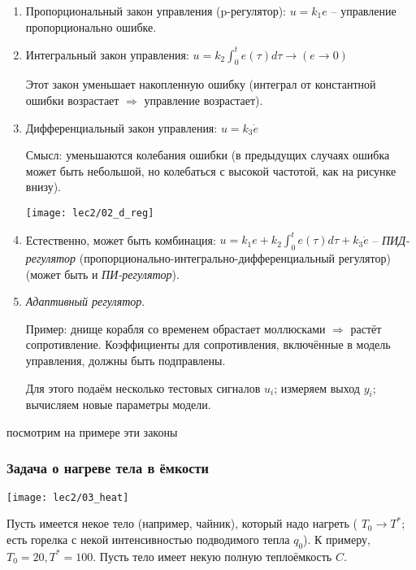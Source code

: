 \documentclass[main.tex]{subfiles}
\begin{document}
\begin{enumerate}[noitemsep]
	\item Пропорциональный закон управления (p-регулятор): $ u = k_1 e $ -- управление пропорционально ошибке.
	\item Интегральный закон управления: $ u = k_2 \int_{0}^{t} e(\tau)d\tau \longrightarrow (e  \to 0) $

	Этот закон уменьшает накопленную ошибку (интеграл от константной ошибки возрастает $ \Rightarrow $ управление возрастает).
	\item Дифференциальный закон управления: $ u = k_3 \dot e $

	Смысл: уменьшаются колебания ошибки (в предыдущих случаях ошибка может быть небольшой, но колебаться с высокой частотой, как на рисунке внизу).

    \texttt{[image: lec2/02\_d\_reg]}

	\item Естественно, может быть комбинация: $ u = k_1e + k_2 \int_{0}^{t} e(\tau)d\tau + k_3 \dot e $ -- \emph{ПИД-регулятор} (пропорционально-интегрально-дифференциальный регулятор) (может быть и \emph{ПИ-регулятор}).

    \item \emph{ Адаптивный регулятор}.

    Пример: днище корабля со временем обрастает моллюсками $ \Rightarrow $ растёт сопротивление.
    Коэффициенты для сопротивления, включённые в модель управления, должны быть подправлены.

    Для этого подаём несколько тестовых сигналов $ u_i $; измеряем выход $ y_i $; вычисляем новые параметры модели.

\end{enumerate}

посмотрим на примере эти законы

\subsubsection{Задача о нагреве тела в ёмкости}

\texttt{[image: lec2/03\_heat]}

Пусть имеется некое тело (например, чайник), который надо нагреть ( $T_0 \to T^*$; есть горелка с некой интенсивностью подводимого тепла $ q_0 $).
К примеру, $ T_0=20, T^*=100 $. Пусть тело имеет некую полную теплоёмкость $ C $.
\end{document}
